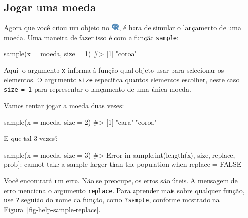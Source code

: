 \documentclass[
  letterpaper,
]{book}
\newenvironment{Shaded}{\begin{snugshade}}{\end{snugshade}}
\newcommand{\AttributeTok}[1]{\textcolor[rgb]{0.40,0.45,0.13}{#1}}
\newcommand{\CommentTok}[1]{\textcolor[rgb]{0.37,0.37,0.37}{#1}}
\newcommand{\DecValTok}[1]{\textcolor[rgb]{0.68,0.00,0.00}{#1}}
\newcommand{\FunctionTok}[1]{\textcolor[rgb]{0.28,0.35,0.67}{#1}}
\newcommand{\NormalTok}[1]{\textcolor[rgb]{0.00,0.23,0.31}{#1}}
\theoremstyle{definition}
\theoremstyle{plain}
\theoremstyle{remark}
\begin{document}
\subsection{Jogar uma moeda}\label{jogar-uma-moeda}

Agora que você criou um objeto no
\includegraphics[width=1.13em,height=1em]{getting_started_with_r_files/figure-pdf/fa-icon-9b00320707d42527dde67262afb33ded.pdf},
é hora de simular o lançamento de uma moeda. Uma maneira de fazer isso é
com a função \texttt{sample}:

\begin{Shaded}
\begin{Highlighting}[]
\FunctionTok{sample}\NormalTok{(}\AttributeTok{x =}\NormalTok{ moeda, }\AttributeTok{size =} \DecValTok{1}\NormalTok{)}
\CommentTok{\#\textgreater{} [1] "coroa"}
\end{Highlighting}
\end{Shaded}

Aqui, o argumento \texttt{x} informa à função qual objeto usar para
selecionar os elementos. O argumento \texttt{size} especifica quantos
elementos escolher, neste caso \texttt{size\ =\ 1} para representar o
lançamento de uma única moeda.

Vamos tentar jogar a moeda duas vezes:

\begin{Shaded}
\begin{Highlighting}[]
\FunctionTok{sample}\NormalTok{(}\AttributeTok{x =}\NormalTok{ moeda, }\AttributeTok{size =} \DecValTok{2}\NormalTok{)}
\CommentTok{\#\textgreater{} [1] "cara"  "coroa"}
\end{Highlighting}
\end{Shaded}

E que tal 3 vezes?

\begin{Shaded}
\begin{Highlighting}[]
\FunctionTok{sample}\NormalTok{(}\AttributeTok{x =}\NormalTok{ moeda, }\AttributeTok{size =} \DecValTok{3}\NormalTok{)}
\CommentTok{\#\textgreater{} Error in sample.int(length(x), size, replace, prob): cannot take a sample larger than the population when \textquotesingle{}replace = FALSE\textquotesingle{}}
\end{Highlighting}
\end{Shaded}

Você encontrará um erro. Não se preocupe, os erros são úteis. A mensagem
de erro menciona o argumento \texttt{replace}. Para aprender mais sobre
qualquer função, use \texttt{?} seguido do nome da função, como
\texttt{?sample}, conforme mostrado na
Figura~\ref{fig-help-sample-replace}.
\end{document}
